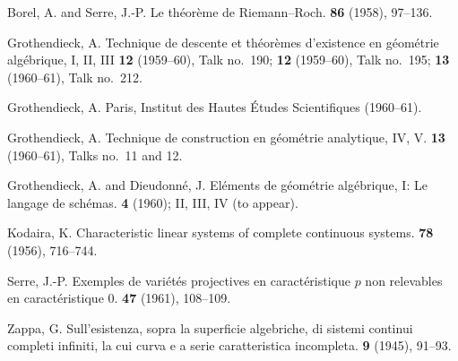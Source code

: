 \documentclass{article}
\begin{document}
\nocite{*}
\begin{thebibliography}{8}

  {Borel, A. and Serre, J.-P.}
  \newblock Le th\'{e}or\`{e}me de Riemann--Roch.
   \textbf{86} (1958), 97--136.

  {Grothendieck, A.}
  \newblock Technique de descente et th\'{e}or\`{e}mes d'existence en g\'{e}om\'{e}trie alg\'{e}brique, I, II, III
   \textbf{12} (1959--60), Talk no.~190; \textbf{12} (1959--60), Talk no.~195; \textbf{13} (1960--61), Talk no.~212.

  {Grothendieck, A.}
  \newblock Paris, Institut des Hautes \'{E}tudes Scientifiques (1960--61).

  {Grothendieck, A.}
  \newblock Technique de construction en g\'{e}om\'{e}trie analytique, IV, V.
   \textbf{13} (1960--61), Talks no.~11 and 12.

  {Grothendieck, A. and Dieudonn\'{e}, J.}
  \newblock El\'{e}ments de g\'{e}om\'{e}trie alg\'{e}brique, I: Le langage de sch\'{e}mas.
   \textbf{4} (1960); II, III, IV (to appear).

  {Kodaira, K.}
  \newblock Characteristic linear systems of complete continuous systems.
   \textbf{78} (1956), 716--744.

  {Serre, J.-P.}
  \newblock Exemples de vari\'{e}t\'{e}s projectives en caract\'{e}ristique $p$ non relevables en caract\'{e}ristique $0$.
   \textbf{47} (1961), 108--109.

  {Zappa, G.}
  \newblock Sull'esistenza, sopra la superficie algebriche, di sistemi continui completi infiniti, la cui curva e a serie caratteristica incompleta.
   \textbf{9} (1945), 91--93.

\end{thebibliography}
\end{document}

